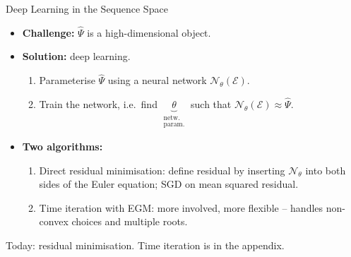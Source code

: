 \documentclass[aspectratio=169,11pt]{beamer}
\newcommand{\emphc}[1]{\textcolor{harvardcrimson}{#1}}
\newcommand{\E}{\mathcal{E}}
\begin{document}
\begin{frame}{Deep Learning in the Sequence Space}
\vspace{0.4em}
\begin{itemize}\itemsep10pt
\item \textbf{Challenge:} $\widehat\Psi$ is a high-dimensional object.

\item \textbf{Solution:} deep learning.
\begin{enumerate}\itemsep1pt
    \item Parameterise $\widehat\Psi$ using a neural network $\mathcal{N}_\theta(\E)$.
    \item Train the network, i.e.\ find $\underbrace{\theta}_{\substack{\text{netw.}\\ \text{param.}}}$ such that $\mathcal{N}_\theta(\E) \approx \widehat\Psi$.
\end{enumerate}

\item \textbf{Two algorithms:}
\begin{enumerate}\itemsep1pt
    \item \emphc{Direct residual minimisation}: define residual by inserting $\mathcal{N}_\theta$ into both sides of the Euler equation; SGD on mean squared residual.
    \item \emphc{Time iteration with EGM}: more involved, more flexible -- handles non-convex choices and multiple roots.
\end{enumerate}
\end{itemize}
\vspace{0.2em}
{\footnotesize Today: residual minimisation.  Time iteration is in the appendix.}
\end{frame}
\end{document}
